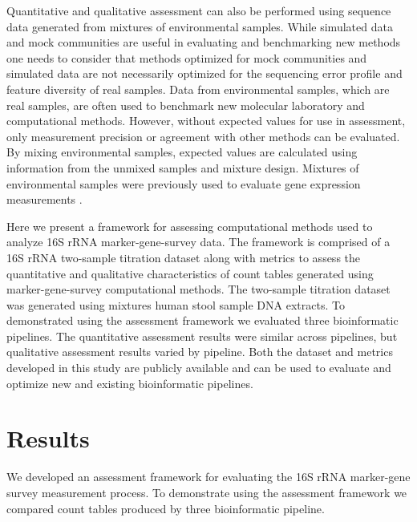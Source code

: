 \documentclass{bmcart}
\begin{document}
Quantitative and qualitative assessment can also be performed using
sequence data generated from mixtures of environmental samples. While
simulated data and mock communities are useful in evaluating and
benchmarking new methods one needs to consider that methods optimized
for mock communities and simulated data are not necessarily optimized
for the sequencing error profile and feature diversity of real samples.
Data from environmental samples, which are real samples, are often used
to benchmark new molecular laboratory and computational methods.
However, without expected values for use in assessment, only measurement
precision or agreement with other methods can be evaluated. By mixing
environmental samples, expected values are calculated using information
from the unmixed samples and mixture design. Mixtures of environmental
samples were previously used to evaluate gene expression measurements
\cite{parsons2015using, pine2011adaptable, thompson2005use}.


Here we present a framework for assessing computational methods used to
analyze 16S rRNA marker-gene-survey data. The framework is comprised of a 16S rRNA
two-sample titration dataset along with metrics to assess the quantitative and qualitative characteristics of count tables generated using marker-gene-survey computational methods.
The two-sample titration dataset was generated using mixtures human stool sample DNA extracts.
To demonstrated using the assessment framework we evaluated three bioinformatic pipelines.
The quantitative assessment results were similar across pipelines, but qualitative assessment results varied by pipeline.
Both the dataset and metrics developed in this study are publicly available and can be used to evaluate and optimize
new and existing bioinformatic pipelines.


\section*{Results}
We developed an assessment framework for evaluating the 16S rRNA marker-gene survey measurement process.
To demonstrate using the assessment framework we compared count tables produced by three bioinformatic pipeline.
\end{document}
